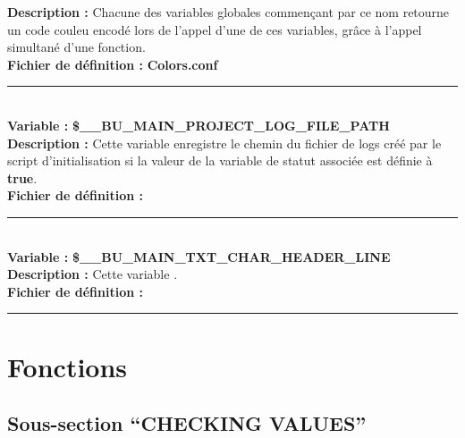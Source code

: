 \documentclass[a4paper,10pt]{article}
\begin{document}
\textbf{Description :} Chacune des variables globales commençant par ce nom retourne un code couleu encodé lors de l'appel d'une de ces variables, grâce à l'appel simultané d'une fonction.\\[1\baselineskip]

\textbf{Fichier de définition :} \textbf{\color{lime}Colors.conf\color{white}}\\[1\baselineskip]



\color{orange}\par\noindent\rule{\textwidth}{0.4pt}\color{white}\\[1\baselineskip]

\textbf{Variable :} \textbf{\color{orange}\$\_\_BU\_MAIN\_PROJECT\_LOG\_FILE\_PATH\color{white}}\\[1\baselineskip]

\textbf{Description :} Cette variable enregistre le chemin du fichier de logs créé par le script d'initialisation si la valeur de la variable de statut associée est définie à \textbf{\color{gray}true\color{white}}.\\[1\baselineskip]

\textbf{Fichier de définition :} \\[1\baselineskip]



\color{orange}\par\noindent\rule{\textwidth}{0.4pt}\color{white}\\[1\baselineskip]

\textbf{Variable :} \textbf{\color{orange}\$\_\_BU\_MAIN\_TXT\_CHAR\_HEADER\_LINE\color{white}}\\[1\baselineskip]

\textbf{Description :} Cette variable .\\[1\baselineskip]

\textbf{Fichier de définition :} \\[1\baselineskip]



\color{red}\par\noindent\rule{\textwidth}{0.4pt}\color{white}

\color{red}
\section{Fonctions}\color{white}

\color{green}
\subsection{Sous-section ``CHECKING VALUES''}
\end{document}
